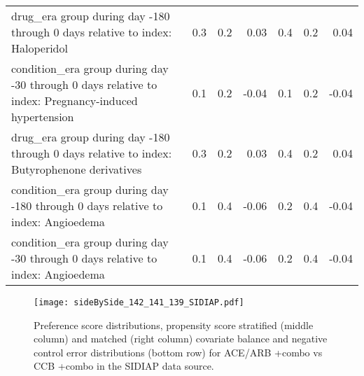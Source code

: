 \documentclass[11pt,]{article}
\begin{document}
\begin{longtable}{p{30em}rrrrrr}
  drug\_era group during day -180 through 0 days relative to index: Haloperidol & 0.3 & 0.2 & 0.03 & 0.4 & 0.2 & 0.04 \\ 
  condition\_era group during day -30 through 0 days relative to index: Pregnancy-induced hypertension & 0.1 & 0.2 & -0.04 & 0.1 & 0.2 & -0.04 \\ 
  drug\_era group during day -180 through 0 days relative to index: Butyrophenone derivatives & 0.3 & 0.2 & 0.03 & 0.4 & 0.2 & 0.04 \\ 
  condition\_era group during day -180 through 0 days relative to index: Angioedema & 0.1 & 0.4 & -0.06 & 0.2 & 0.4 & -0.04 \\ 
  condition\_era group during day -30 through 0 days relative to index: Angioedema & 0.1 & 0.4 & -0.06 & 0.2 & 0.4 & -0.04 \\ 
  \bottomrule
\end{longtable}
\clearpage\begin{figure}[H]
    \caption{Preference score distributions,
    propensity score stratified (middle column) and matched (right column) covariate balance
    and negative control error distributions (bottom row) for
    ACE/ARB +combo vs CCB +combo in the SIDIAP data source.}
    \centerline{
        \texttt{[image: sideBySide\_142\_141\_139\_SIDIAP.pdf]}
    }
\end{figure}
\end{document}
